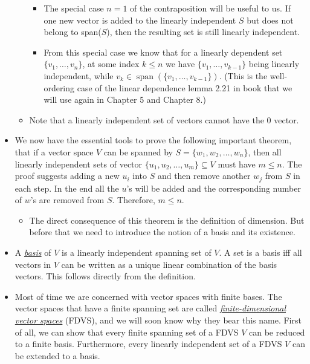 \documentclass{article}
\newcommand{\df}[1]{\ul{\textit{#1}}}
\newcommand{\s}{\operatorname{span}}
\begin{document}
\begin{itemize}
\begin{itemize}
        \begin{itemize}
            \item The special case $n=1$ of the contraposition will be useful to us. If one new vector is added to the linearly independent $S$ but does not belong to span($S$), then the resulting set is still linearly independent.
            \item From this special case we know that for a linearly dependent set $\{v_1,\dots,v_n\}$, at some index $k \leq n$ we have $\{v_1,\dots,v_{k-1}\}$ being linearly independent, while $v_k \in \s(\{v_1,\dots,v_{k-1}\})$. (This is the well-ordering case of the linear dependence lemma 2.21 in book that we will use again in Chapter 5 and Chapter 8.)
        \end{itemize}
        \item Note that a linearly independent set of vectors cannot have the $0$ vector.
    \end{itemize}
    \item We now have the essential tools to prove the following important theorem, that if a vector space $V$ can be spanned by $S = \{w_1, w_2, \dots,w_n\}$, then all linearly independent sets of vector $\{u_1,u_2,\dots,u_m\} \subseteq V$ must have $m \leq n$. The proof suggests adding a new $u_i$ into $S$ and then remove another $w_j$ from $S$ in each step. In the end all the $u$'s will be added and the corresponding number of $w$'s are removed from $S$. Therefore, $m \leq n$.
    \begin{itemize}
        \item The direct consequence of this theorem is the definition of dimension. But before that we need to introduce the notion of a basis and its existence.
    \end{itemize}
    \item A \df{basis} of $V$ is a linearly independent spanning set of $V$. A set is a basis iff all vectors in $V$ can be written as a unique linear combination of the basis vectors. This follows directly from the definition.
    \item Most of time we are concerned with vector spaces with finite bases. The vector spaces that have a finite spanning set are called \df{finite-dimensional vector spaces} (FDVS), and we will soon know why they bear this name. First of all, we can show that every finite spanning set of a FDVS $V$ can be reduced to a finite basis. Furthermore, every linearly independent set of a FDVS $V$ can be extended to a basis.
    \begin{itemize}

\end{itemize}
\end{itemize}
\end{document}

